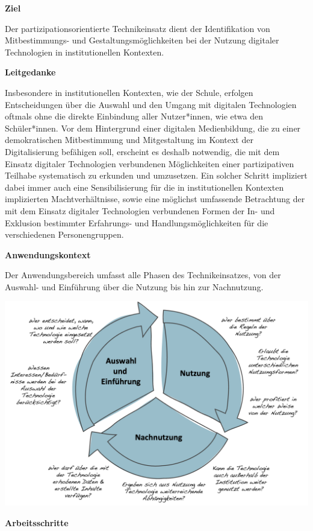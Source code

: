 \documentclass[
  a4paper,
]{book}
\begin{document}
\textbf{Ziel}

Der partizipationsorientierte Technikeinsatz
dient der Identifikation von Mitbestimmungs- und Gestaltungsmöglichkeiten bei der Nutzung digitaler Technologien in institutionellen Kontexten.

\textbf{Leitgedanke}

Insbesondere in institutionellen Kontexten, wie der Schule, erfolgen Entscheidungen über die Auswahl und den Umgang mit digitalen Technologien oftmals ohne die direkte Einbindung aller Nutzer*innen, wie etwa den Schüler*innen. Vor dem Hintergrund einer digitalen Medienbildung, die zu einer demokratischen Mitbestimmung und Mitgestaltung im Kontext der Digitalisierung befähigen soll, erscheint es deshalb notwendig, die mit dem Einsatz digitaler Technologien verbundenen Möglichkeiten einer partizipativen Teilhabe systematisch zu erkunden und umzusetzen. Ein solcher Schritt impliziert dabei immer auch eine Sensibilisierung für die in institutionellen Kontexten implizierten Machtverhältnisse, sowie eine möglichst umfassende Betrachtung der mit dem Einsatz digitaler Technologien verbundenen Formen der In- und Exklusion bestimmter Erfahrungs- und Handlungsmöglichkeiten für die verschiedenen Personengruppen.

\textbf{Anwendungskontext}

Der Anwendungsbereich umfasst alle Phasen des Technikeinsatzes, von der Auswahl- und Einführung über die Nutzung bis hin zur Nachnutzung.

\begin{center}\includegraphics{Figures/14-02-PartTechnik} \end{center}

\textbf{Arbeitsschritte}
\end{document}
